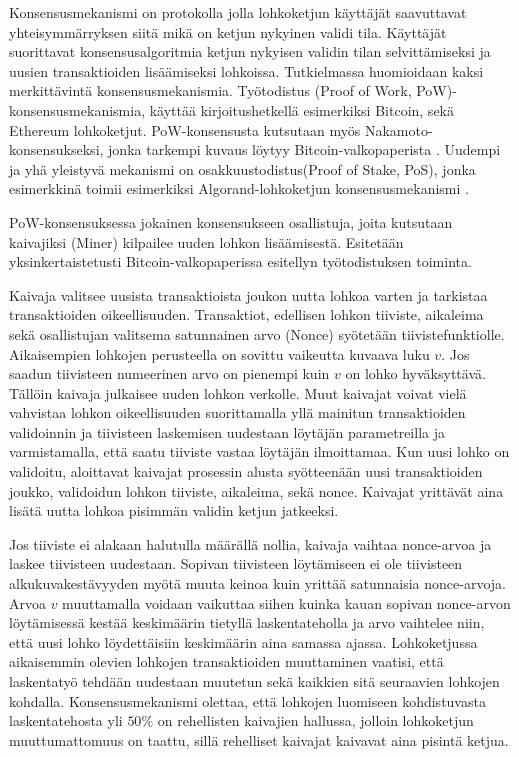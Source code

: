 Konsensusmekanismi on protokolla jolla lohkoketjun käyttäjät saavuttavat yhteisymmärryksen siitä mikä on ketjun nykyinen validi tila. Käyttäjät suorittavat konsensusalgoritmia ketjun nykyisen validin tilan selvittämiseksi ja uusien transaktioiden lisäämiseksi lohkoissa. Tutkielmassa huomioidaan kaksi merkittävintä konsensusmekanismia. Työtodistus (Proof of Work, PoW)-konsensusmekanismia, käyttää kirjoitushetkellä esimerkiksi Bitcoin, sekä Ethereum lohkoketjut. PoW-konsensusta kutsutaan myös Nakamoto-konsensukseksi, jonka tarkempi kuvaus löytyy Bitcoin-valkopaperista \cite{Nakamoto_bitcoin}. Uudempi ja yhä yleistyvä mekanismi on osakkuustodistus(Proof of Stake, PoS), jonka esimerkkinä toimii esimerkiksi Algorand-lohkoketjun konsensusmekanismi \cite{gilad_algorand_2017}. 

PoW-konsensuksessa jokainen konsensukseen osallistuja, joita kutsutaan kaivajiksi (Miner) kilpailee uuden lohkon lisäämisestä. Esitetään yksinkertaistetusti Bitcoin-valkopaperissa esitellyn työtodistuksen toiminta.

Kaivaja valitsee uusista transaktioista joukon uutta lohkoa varten ja tarkistaa transaktioiden oikeellisuuden. Transaktiot, edellisen lohkon tiiviste, aikaleima sekä osallistujan valitsema satunnainen arvo (Nonce) syötetään tiivistefunktiolle. Aikaisempien lohkojen perusteella on sovittu vaikeutta kuvaava luku $v$. Jos saadun tiivisteen numeerinen arvo on pienempi kuin $v$ on lohko hyväksyttävä. Tällöin kaivaja julkaisee uuden lohkon verkolle. Muut kaivajat voivat vielä vahvistaa lohkon oikeellisuuden suorittamalla yllä mainitun transaktioiden validoinnin ja tiivisteen laskemisen uudestaan löytäjän parametreilla ja varmistamalla, että saatu tiiviste vastaa löytäjän ilmoittamaa. Kun uusi lohko on validoitu, aloittavat kaivajat prosessin alusta syötteenään uusi transaktioiden joukko, validoidun lohkon tiiviste, aikaleima, sekä nonce. Kaivajat yrittävät aina lisätä uutta lohkoa pisimmän validin ketjun jatkeeksi. 

Jos tiiviste ei alakaan halutulla määrällä nollia, kaivaja vaihtaa nonce-arvoa ja laskee tiivisteen uudestaan. Sopivan tiivisteen löytämiseen ei ole tiivisteen alkukuvakestävyyden myötä muuta keinoa kuin yrittää satunnaisia nonce-arvoja. Arvoa $v$ muuttamalla voidaan vaikuttaa siihen kuinka kauan sopivan nonce-arvon löytämisessä kestää keskimäärin tietyllä laskentateholla ja arvo vaihtelee niin, että uusi lohko löydettäisiin keskimäärin aina samassa ajassa. Lohkoketjussa aikaisemmin olevien lohkojen transaktioiden muuttaminen vaatisi, että laskentatyö tehdään uudestaan muutetun sekä kaikkien sitä seuraavien lohkojen kohdalla. Konsensusmekanismi olettaa, että lohkojen luomiseen kohdistuvasta laskentatehosta yli $50\%$ on rehellisten kaivajien hallussa, jolloin lohkoketjun muuttumattomuus on taattu, sillä rehelliset kaivajat kaivavat aina pisintä ketjua.

